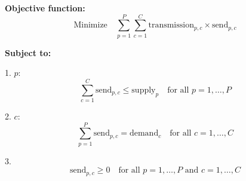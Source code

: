 \documentclass{article}
\begin{document}
\textbf{Objective function:}
\[
\text{Minimize} \quad \sum_{p=1}^{P} \sum_{c=1}^{C} \text{transmission}_{p,c} \times \text{send}_{p,c}
\]

\textbf{Subject to:}

1.  \( p \):
\[
\sum_{c=1}^{C} \text{send}_{p,c} \leq \text{supply}_p \quad \text{for all } p = 1, \ldots, P
\]

2.  \( c \):
\[
\sum_{p=1}^{P} \text{send}_{p,c} = \text{demand}_c \quad \text{for all } c = 1, \ldots, C
\]

3. 
\[
\text{send}_{p,c} \geq 0 \quad \text{for all } p = 1, \ldots, P \text{ and } c = 1, \ldots, C
\]
\end{document}
